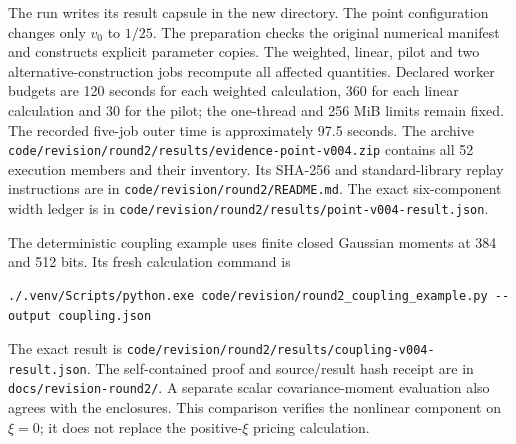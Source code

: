 The run writes its result capsule in the new directory. The point configuration
changes only \(v_0\) to \(1/25\). The preparation checks
the original numerical manifest and constructs explicit parameter copies.
The weighted, linear, pilot and two alternative-construction jobs recompute
all affected quantities. Declared worker budgets are 120 seconds for each
weighted calculation, 360 for each linear calculation and 30 for the pilot;
the one-thread and 256 MiB limits remain fixed. The recorded five-job outer time
is approximately 97.5 seconds. The archive
\texttt{code/revision/round2/results/evidence-point-v004.zip} contains all 52
execution members and their inventory. Its SHA-256 and standard-library replay
instructions are in \texttt{code/revision/round2/README.md}. The exact six-component
width ledger is in \texttt{code/revision/round2/results/point-v004-result.json}.

The deterministic coupling example uses finite closed Gaussian moments at
384 and 512 bits. Its fresh calculation command is

\begin{verbatim}
./.venv/Scripts/python.exe code/revision/round2_coupling_example.py --output coupling.json
\end{verbatim}

The exact result is \texttt{code/revision/round2/results/coupling-v004-result.json}.
The self-contained proof and source/result hash receipt are in
\texttt{docs/revision-round2/}. A separate scalar covariance-moment evaluation
also agrees with the enclosures. This comparison verifies the nonlinear
component on \(\xi=0\); it does not replace the positive-\(\xi\) pricing calculation.
